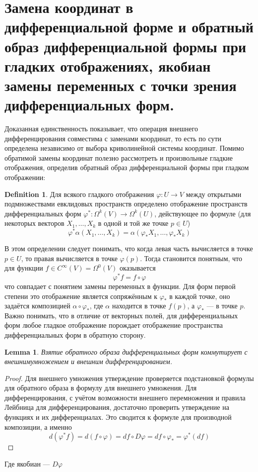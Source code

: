\documentclass[a4paper,12pt]{article} %
\newtheorem{lemma}[theorem]{Lemma}
\theoremstyle{definition}
\newtheorem{definition}{Definition}[section]
\begin{document}
\section{Замена координат в дифференциальной форме и обратный образ дифференциальной формы при гладких отображениях, якобиан замены переменных с точки зрения дифференциальных форм.}
Доказанная единственность показывает, что операция внешнего дифференцирования совместима с заменами координат, то есть по сути определена независимо от выбора криволинейной системы координат. Помимо обратимой замены координат полезно рассмотреть и произвольные гладкие отображения, определив обратный образ дифференциальной формы при гладком отображении:
\begin{definition}
	Для всякого гладкого отображения $\varphi : U \rightarrow V$ между открытыми подмножествами евклидовых пространств определено отображение пространств дифференциальных форм $\varphi^* :  \Omega^k(V) \rightarrow \Omega^k(U)$,  действующее по формуле (для некоторых векторов $X_1,\dots,X_k$ в одной и той же точке $p \in U$)
	\begin{equation}
		\varphi^* \alpha(X_1, \dots, X_k) = \alpha(\varphi_* X_1, \dots, \varphi_* X_k)
	\end{equation}
\end{definition}
В этом определении следует понимать, что когда левая часть вычисляется в точке $p \in U$, то правая вычисляется в точке $\varphi (p)$. Тогда становится понятным, что для функции $f \in C^{\infty}(V) = \Omega^0(V)$ оказывается
\begin{equation}
	\varphi^* f = f \circ \varphi
\end{equation}
что совпадает с понятием замены переменных в функции. Для форм первой степени это отображение является сопряжённым к $\varphi_*$ в каждой точке, оно задаётся композицией $\alpha \circ \varphi_*$, где $\alpha$ находится в точке $f(p)$, а $\varphi_*$ --- в точке $p$.\\
Важно понимать, что в отличие от векторных полей, для дифференциальных форм любое гладкое отображение порождает отображение пространства дифференциальных форм в обратную сторону.
\begin{lemma}
	Взятие обратного образа дифференциальных форм коммутирует с внешнимумножением и внешним дифференцированием.
\end{lemma}
\begin{proof}
	Для внешнего умножения утверждение проверяется подстановкой формулы для обратного образа в формулу для внешнего умножения. Для дифференцирования, с учётом возможности внешнего перемножения и правила Лейбница для дифференцирования, достаточно проверить утверждение на функциях и их дифференциалах. Это сводится к формуле для производной композиции, а именно
	\begin{equation}
		d(\varphi^* f) = d (f \circ \varphi) = df \circ D\varphi = df \circ \varphi_* = \varphi^* (df)
	\end{equation}
\end{proof}
Где якобиан --- $D\varphi$
\end{document}
